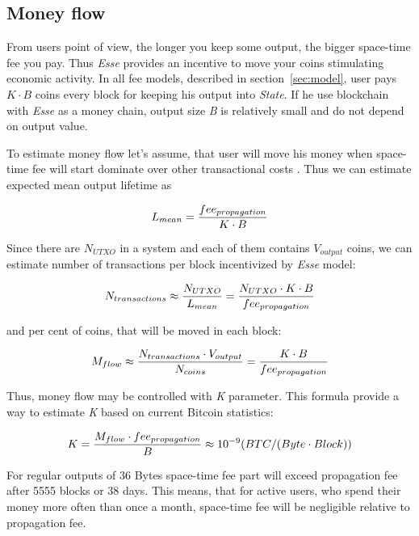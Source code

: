 \documentclass[]{article}   %
\newcommand{\authnote}[2]{\marginpar{\parbox{\marginparwidth}{\tiny %
  \textsf{#1 {\textcolor{blue}{notes: #2}}}}}%
  \textcolor{blue}{\textbf{\dag}}}
\newcommand{\authnote}[2]{
  \textsf{#1 \textcolor{blue}{: #2}}}
\newcommand{\authnote}[2]{}
\newcommand{\dnote}[1]{{\authnote{\textcolor{blue}{Dima notes}}{#1}}}
\newcommand{\esse}{\textit{Esse}}
\newcommand{\state}{\textit{State}}
\begin{document}
\subsection{Money flow}
\label{sec:flow}

From users point of view, the longer you keep some output, the bigger space-time fee you pay. Thus \esse{} provides an incentive to move your coins stimulating economic activity. In all fee models, described in section~\ref{sec:model}, user pays ${K \cdot B}$ coins every block for keeping his output into \state{}. If he use blockchain with \esse{} as a money chain, output size \textit{B} is relatively small and do not depend on output value.

To estimate money flow let's assume, that user will move his money when space-time fee will start dominate over other transactional costs \dnote{why?}. Thus we can estimate expected mean output lifetime as

\begin{equation}
\label{eq:ltmean}
L_{mean}={fee_{propagation} \over K \cdot B}
\end{equation}

Since there are $N_{UTXO}$ in a system and each of them contains $V_{output}$ coins, we can estimate number of transactions per block incentivized by \esse{} model:

\begin{equation}
N_{transactions} \approx {N_{UTXO} \over L_{mean}} = {N_{UTXO} \cdot K \cdot B \over fee_{propagation}}
\end{equation}

and per cent of coins, that will be moved in each block:

\begin{equation}
M_{flow} \approx { N_{transactions} \cdot V_{output} \over N_{coins}} = {K \cdot B \over fee_{propagation}}
\end{equation}

Thus, money flow may be controlled with \textit{K} parameter. This formula provide a way to estimate \textit{K} based on current Bitcoin statistics:

\begin{equation}
K={M_{flow} \cdot fee_{propagation} \over B} \approx {10^{-9}} ({BTC / (Byte \cdot Block)})
\end{equation}

For regular outputs of 36 Bytes space-time fee part will exceed propagation fee after 5555 blocks or 38 days. This means, that for active users, who spend their money more often than once a month, space-time fee will be negligible relative to propagation fee.
\end{document}
